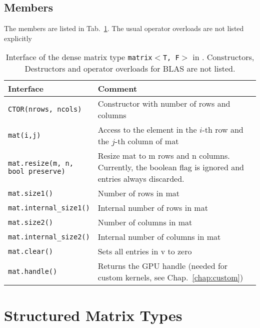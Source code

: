 \subsection{Members}

The members are listed in Tab.~\ref{tab:matrix-interface}. The usual operator overloads are not listed explicitly

\begin{table}[tb]
\begin{center}
\begin{tabular}{p{6.5cm}|p{8.5cm}}
Interface & Comment\\
\hline
\texttt{CTOR(nrows, ncols)}    & Constructor with number of rows and columns \\
\texttt{mat(i,j)}    & Access to the element in the $i$-th row and the $j$-th column of mat \\
\parbox{6cm}{\texttt{mat.resize(m, n, \\
           \hphantom{mat.resize(}bool preserve)}}    & Resize mat to m rows and n columns. Currently, the boolean flag is ignored and entries always discarded. \\
\texttt{mat.size1()}            & Number of rows in mat \\
\texttt{mat.internal\_size1()}   & Internal number of rows in mat \\
\texttt{mat.size2()}            & Number of columns in mat \\
\texttt{mat.internal\_size2()}   & Internal number of columns in mat \\
\texttt{mat.clear()}   & Sets all entries in v to zero \\
\texttt{mat.handle()}  & Returns the GPU handle (needed for custom kernels, see Chap.~\ref{chap:custom})
\end{tabular}
\caption{Interface of the dense matrix type \texttt{matrix$<$T, F$>$} in
\ViennaCL. Constructors, Destructors and operator overloads for BLAS are not
listed.}
\label{tab:matrix-interface}
\end{center}
\end{table}

\section{Structured Matrix Types}

